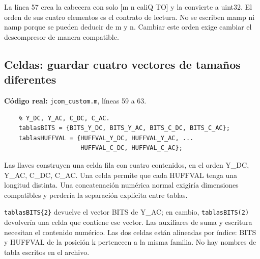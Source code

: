 \documentclass[11pt,a4paper,oneside]{report}
\begin{document}
La línea 57 crea la cabecera con solo [m n caliQ TO] y la convierte a uint32.
El orden de sus cuatro elementos es el contrato de lectura. No se escriben
mamp ni namp porque se pueden deducir de m y n. Cambiar este orden exige
cambiar el descompresor de manera compatible.


\par\medskip\noindent\begin{minipage}{\linewidth}

\subsection{Celdas: guardar cuatro vectores de tamaños diferentes}

\textbf{Código real:} \texttt{jcom\_custom.m}, líneas 59 a 63.

\begin{lstlisting}[firstnumber=59]
    % Agrupar las cuatro especificaciones en un orden fijo:
    % Y_DC, Y_AC, C_DC, C_AC.
    tablasBITS = {BITS_Y_DC, BITS_Y_AC, BITS_C_DC, BITS_C_AC};
    tablasHUFFVAL = {HUFFVAL_Y_DC, HUFFVAL_Y_AC, ...
                     HUFFVAL_C_DC, HUFFVAL_C_AC};
\end{lstlisting}

\end{minipage}\par


Las llaves construyen una celda fila con cuatro contenidos, en el orden
Y\_DC, Y\_AC, C\_DC, C\_AC. Una celda permite que cada HUFFVAL tenga una
longitud distinta. Una concatenación numérica normal exigiría dimensiones
compatibles y perdería la separación explícita entre tablas.

\texttt{tablasBITS\{2\}} devuelve el vector BITS de Y\_AC; en cambio,
\texttt{tablasBITS(2)} devolvería una celda que contiene ese vector. Las
auxiliares de suma y escritura necesitan el contenido numérico. Las dos
celdas están alineadas por índice: BITS y HUFFVAL de la posición k pertenecen
a la misma familia. No hay nombres de tabla escritos en el archivo.
\end{document}
